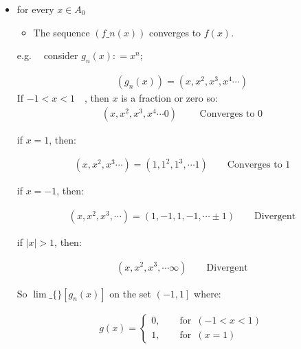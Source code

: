 \documentclass[class=article, crop=false]{standalone}
\begin{document}
\begin{itemize}
\item
  for every \(x \in A_0\)

  \begin{itemize}
  \item
    The sequence \(\left( f\_n\left( x \right) \right) \) converges to
    \(f\left( x \right) \).
  \end{itemize}

  e.g.~\(\ \ \) consider \(g_n\left( x \right) : = x^n\);

  \begin{align*}
    \left( g_n\left( x \right)  \right) = \left( x, x^2, x^3, x^4 \cdots \right)
  \end{align*}
   If \(- 1 < x < 1 \quad\), then $x$ is a fraction or zero so:
  \begin{align*}
    \left( x, x^2, x^3, x^4 \cdots 0 \right) \qquad \text{ Converges to 0}
  \end{align*}

  if \(x = 1\), then:

  \begin{align*}
    \left( x, x^2, x^3 \cdots \right) = \left( 1, 1^2, 1^3, \cdots 1 \right)  \qquad \text{Converges to 1}
    \end{align*}

   if \(x= -1\), then:

  \begin{align*}
    \left( x, x^2, x^3, \cdots \right) = \left( 1, - 1, 1, - 1, \cdots \pm 1 \right) \qquad \text{Divergent}
  \end{align*}


  if \(\left\lvert x \right\rvert > 1\), then:

  \begin{align*}
    \left( x, x^2, x^3, \cdots \infty \right) \qquad \text{Divergent}
  \end{align*}

  So \(\lim\_\{\}\left[ g_n\left( x \right)  \right]\) on the set
  \(\left(- 1, 1\right] \) where:

  \begin{align*}
  g\left( x \right) =
  \begin{cases}
    0, \qquad \text{for} \enspace \left( - 1<x<1 \right) \\
    1,\qquad \text{for} \enspace \left( x = 1 \right)
  \end{cases}
  \end{align*}

\end{itemize}
\end{document}
